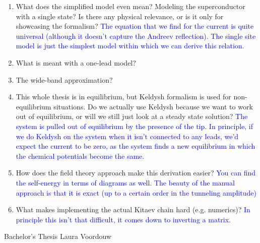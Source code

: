 \begin{tcolorbox}[title = Questions, colback = gray!5, colframe = black]
    \begin{enumerate}
        \item What does the simplified model even mean? Modeling the superconductor with a single state? Is there any physical relevance, or is it only for showcasing the formalism? \textcolor{blue}{The equation that we find for the current is quite universal (although it doesn't capture the Andreev reflection). The single site model is just the simplest model within which we can derive this relation.}
        \item What is meant with a one-lead model?
        \item The wide-band approximation?
        \item This whole thesis is in equilibrium, but Keldysh formalism is used for non-equilibrium situations. Do we actually use Keldysh because we want to work out of equilibrium, or will we still just look at a steady state solution? \textcolor{blue}{The system is pulled out of equilibrium by the presence of the tip. In principle, if we do Keldysh on the system when it isn't connected to any leads, we'd expect the current to be zero, as the system finds a new equilibrium in which the chemical potentials become the same.}
        \item How does the field theory approach make this derivation easier? \textcolor{blue}{You can find the self-energy in terms of diagrams as well. The beauty of the manual approach is that it is exact (up to a certain order in the tunneling amplitude)}
        \item What makes implementing the actual Kitaev chain hard (e.g. numerics)? \textcolor{blue}{In principle this isn't that difficult, it comes down to inverting a matrix.}
    \end{enumerate}
\end{tcolorbox}

\begin{tcolorbox}[title = Sources, colback = gray!5, colframe = gray]
    Bachelor's Thesis Laura Voordouw
\end{tcolorbox}
